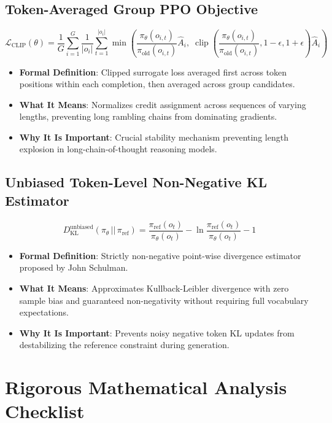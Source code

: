 \documentclass[11pt,a4paper]{article}
\theoremstyle{definition}
\begin{document}
\subsection{Token-Averaged Group PPO Objective}
{\boldmath
\begin{equation}
\mathcal{L}_{\text{CLIP}}(\theta) = \frac{1}{G}\sum_{i=1}^G \frac{1}{|o_i|}\sum_{t=1}^{|o_i|} \min\left( \frac{\pi_\theta(o_{i, t})}{\pi_{\text{old}}(o_{i, t})} \hat{A}_i, \; \operatorname{clip}\left(\frac{\pi_\theta(o_{i, t})}{\pi_{\text{old}}(o_{i, t})}, 1 - \epsilon, 1 + \epsilon\right) \hat{A}_i \right)
\end{equation}
}
\begin{itemize}
    \item \textbf{Formal Definition}: Clipped surrogate loss averaged first across token positions within each completion, then averaged across group candidates.
    \item \textbf{What It Means}: Normalizes credit assignment across sequences of varying lengths, preventing long rambling chains from dominating gradients.
    \item \textbf{Why It Is Important}: Crucial stability mechanism preventing length explosion in long-chain-of-thought reasoning models.
\end{itemize}

\subsection{Unbiased Token-Level Non-Negative KL Estimator}
{\boldmath
\begin{equation}
D_{\text{KL}}^{\text{unbiased}}(\pi_\theta \,||\, \pi_{\text{ref}}) = \frac{\pi_{\text{ref}}(o_t)}{\pi_\theta(o_t)} - \ln \frac{\pi_{\text{ref}}(o_t)}{\pi_\theta(o_t)} - 1
\end{equation}
}
\begin{itemize}
    \item \textbf{Formal Definition}: Strictly non-negative point-wise divergence estimator proposed by John Schulman.
    \item \textbf{What It Means}: Approximates Kullback-Leibler divergence with zero sample bias and guaranteed non-negativity without requiring full vocabulary expectations.
    \item \textbf{Why It Is Important}: Prevents noisy negative token KL updates from destabilizing the reference constraint during generation.
\end{itemize}

\section{Rigorous Mathematical Analysis Checklist}
\end{document}
